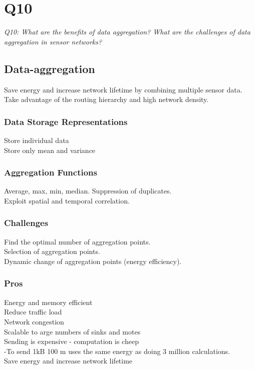 \chapter{Q10}
\emph{Q10: What are the benefits of data aggregation? What are the challenges
of data aggregation in sensor networks?}

\section{Data-aggregation}
Save energy and increase network lifetime by combining multiple sensor data.
\\
Take advantage of the routing hierarchy and high network density.

\subsection{Data Storage Representations}
Store individual data
\\
Store only mean and variance

\subsection{Aggregation Functions}
Average, max, min, median.
Suppression of duplicates.
\\
Exploit spatial and temporal correlation.

\subsection{Challenges}
Find the optimal number of aggregation points.
\\
Selection of aggregation points.
\\
Dynamic change of aggregation points (energy efficiency).

\subsection{Pros}
Energy and memory efficient
\\
Reduce traffic load
\\
Network congestion
\\
Scalable to arge numbers of sinks and motes
\\
Sending is expensive - computation is cheep
\\
-To send 1kB 100 m uses the same energy as doing 3 million calculations.
\\
Save energy and increase network lifetime

